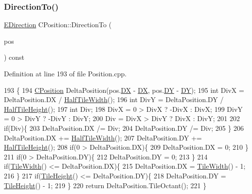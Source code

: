 \subsubsection{\texorpdfstring{Direction\+To()}{DirectionTo()}}
{\footnotesize\ttfamily \hyperlink{GameDataTypes_8h_acb2b033915f6659a71a38b5aa6e4eb42}{E\+Direction} C\+Position\+::\+Direction\+To (\begin{DoxyParamCaption}\item[{const \hyperlink{classCPosition}{C\+Position} \&}]{pos }\end{DoxyParamCaption}) const}



Definition at line 193 of file Position.\+cpp.


\begin{DoxyCode}
193                                                            \{
194     \hyperlink{classCPosition}{CPosition} DeltaPosition(pos.\hyperlink{classCPosition_a28445f9b872169715919074d82044eda}{DX} - \hyperlink{classCPosition_a28445f9b872169715919074d82044eda}{DX}, pos.\hyperlink{classCPosition_a84139c9e8eb547e7cf3cb851739943a4}{DY} - \hyperlink{classCPosition_a84139c9e8eb547e7cf3cb851739943a4}{DY});
195     \textcolor{keywordtype}{int} DivX = DeltaPosition.DX / \hyperlink{classCPosition_a4b799a0fb78ddd8bbd8548980e2458af}{HalfTileWidth}();
196     \textcolor{keywordtype}{int} DivY = DeltaPosition.DY / \hyperlink{classCPosition_a5e371060b1aa0d3d3c5df1e353e0e5fd}{HalfTileHeight}();
197     \textcolor{keywordtype}{int} Div;
198     DivX = 0 > DivX ? -DivX : DivX;
199     DivY = 0 > DivY ? -DivY : DivY;
200     Div = DivX > DivY ? DivX : DivY;
201 
202     \textcolor{keywordflow}{if}(Div)\{
203         DeltaPosition.DX /= Div;
204         DeltaPosition.DY /= Div;
205     \}
206     DeltaPosition.DX += \hyperlink{classCPosition_a4b799a0fb78ddd8bbd8548980e2458af}{HalfTileWidth}();
207     DeltaPosition.DY += \hyperlink{classCPosition_a5e371060b1aa0d3d3c5df1e353e0e5fd}{HalfTileHeight}();
208     \textcolor{keywordflow}{if}(0 > DeltaPosition.DX)\{
209         DeltaPosition.DX = 0;
210     \}
211     \textcolor{keywordflow}{if}(0 > DeltaPosition.DY)\{
212         DeltaPosition.DY = 0;
213     \}
214     \textcolor{keywordflow}{if}(\hyperlink{classCPosition_a27a7a8b9a5541da0aa8d97d785650fb8}{TileWidth}() <= DeltaPosition.DX)\{
215         DeltaPosition.DX = \hyperlink{classCPosition_a27a7a8b9a5541da0aa8d97d785650fb8}{TileWidth}() - 1;
216     \}
217     \textcolor{keywordflow}{if}(\hyperlink{classCPosition_ac4f0edd9c9632f1bdca981ef5d9b71e5}{TileHeight}() <= DeltaPosition.DY)\{
218         DeltaPosition.DY = \hyperlink{classCPosition_ac4f0edd9c9632f1bdca981ef5d9b71e5}{TileHeight}() - 1;
219     \}
220     \textcolor{keywordflow}{return} DeltaPosition.TileOctant();
221 \}
\end{DoxyCode}
